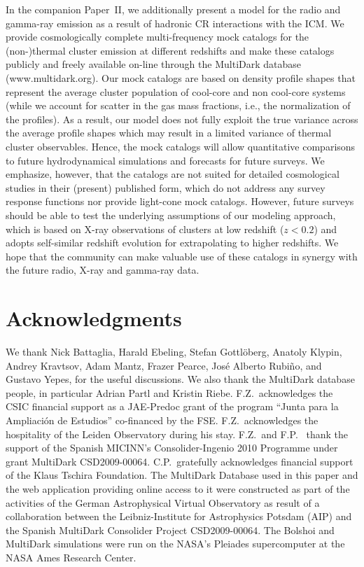 \documentclass[useAMS,usenatbib]{mn2e}
\begin{document}
{  In the companion Paper~II, we additionally present a model for the radio and
  gamma-ray emission as a result of hadronic CR interactions with the ICM.  We
  provide cosmologically complete multi-frequency mock catalogs for the
  \mbox{(non-)thermal} cluster emission at different redshifts and make these
  catalogs publicly and freely available on-line through the MultiDark database
  (www.multidark.org). Our mock catalogs are based on density profile shapes
  that represent the average cluster population of cool-core and non cool-core
  systems (while we account for scatter in the gas mass fractions, i.e., the
  normalization of the profiles). As a result, our model does not fully exploit
  the true variance across the average profile shapes which may result in a
  limited variance of thermal cluster observables.  Hence, the mock catalogs
  will allow quantitative comparisons to future hydrodynamical simulations and
  forecasts for future surveys.  We emphasize, however, that the catalogs are
  not suited for detailed cosmological studies in their (present) published
  form, which do not address any survey response functions nor provide
  light-cone mock catalogs. However, future surveys should be able to test the
  underlying assumptions of our modeling approach, which is based on X-ray
  observations of clusters at low redshift ($z<0.2$) and adopts self-similar
  redshift evolution for extrapolating to higher redshifts. We hope that the
  community can make valuable use of these catalogs in synergy with the future
  radio, X-ray and gamma-ray data.}



\section*{Acknowledgments}
We thank Nick Battaglia, Harald Ebeling, Stefan Gottl{\"o}berg, Anatoly Klypin,
Andrey Kravtsov, Adam Mantz, Frazer Pearce, Jos\'e Alberto Rubi\~no, and Gustavo
Yepes, for the useful discussions. We also thank the MultiDark database people,
in particular Adrian Partl and Kristin Riebe.  F.Z.{\ }acknowledges the CSIC
financial support as a JAE-Predoc grant of the program ``Junta para la
Ampliaci\'on de Estudios'' co-financed by the FSE.  F.Z.{\ }acknowledges the
hospitality of the Leiden Observatory during his stay.  F.Z.{\ }and F.P.{\ }
thank the support of the Spanish MICINN's Consolider-Ingenio 2010 Programme
under grant MultiDark CSD2009-00064. C.P.{\ }gratefully acknowledges financial
support of the Klaus Tschira Foundation. The MultiDark Database used in this
paper and the web application providing online access to it were constructed as
part of the activities of the German Astrophysical Virtual Observatory as result
of a collaboration between the Leibniz-Institute for Astrophysics Potsdam (AIP)
and the Spanish MultiDark Consolider Project CSD2009-00064. The Bolshoi and
MultiDark simulations were run on the NASA's Pleiades supercomputer at the NASA
Ames Research Center.
\end{document}
